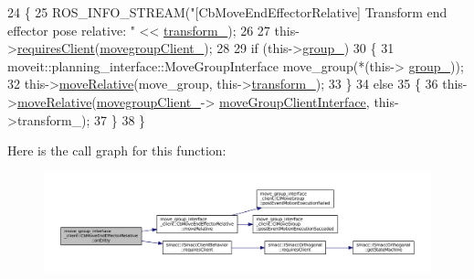 \begin{DoxyCode}
24     \{
25         ROS\_INFO\_STREAM(\textcolor{stringliteral}{"[CbMoveEndEffectorRelative] Transform end effector pose relative: "} << 
      \hyperlink{classmove__group__interface__client_1_1CbMoveEndEffectorRelative_a180b4e40316bc8d8d578c98b2fac068f}{transform\_});
26 
27         this->\hyperlink{classsmacc_1_1ISmaccClientBehavior_a32b16e99e3b4cb289414203dc861a440}{requiresClient}(\hyperlink{classmove__group__interface__client_1_1CbMoveEndEffectorRelative_a979ec9c309b1b52a0d0e254b49865fdc}{movegroupClient\_});
28 
29         \textcolor{keywordflow}{if} (this->\hyperlink{classmove__group__interface__client_1_1CbMoveEndEffectorRelative_a3165754a85fd7046e470a399f24d9fb6}{group\_})
30         \{
31             moveit::planning\_interface::MoveGroupInterface move\_group(*(this->
      \hyperlink{classmove__group__interface__client_1_1CbMoveEndEffectorRelative_a3165754a85fd7046e470a399f24d9fb6}{group\_}));
32             this->\hyperlink{classmove__group__interface__client_1_1CbMoveEndEffectorRelative_a8f64d14c4a398b455b1953ae61cc58bc}{moveRelative}(move\_group, this->\hyperlink{classmove__group__interface__client_1_1CbMoveEndEffectorRelative_a180b4e40316bc8d8d578c98b2fac068f}{transform\_});
33         \}
34         \textcolor{keywordflow}{else}
35         \{
36             this->\hyperlink{classmove__group__interface__client_1_1CbMoveEndEffectorRelative_a8f64d14c4a398b455b1953ae61cc58bc}{moveRelative}(\hyperlink{classmove__group__interface__client_1_1CbMoveEndEffectorRelative_a979ec9c309b1b52a0d0e254b49865fdc}{movegroupClient\_}->
      \hyperlink{classmove__group__interface__client_1_1ClMoveGroup_a5f0ea9b52695661b17605691168d1f31}{moveGroupClientInterface}, this->transform\_);
37         \}
38     \}
\end{DoxyCode}
Here is the call graph for this function\+:
\nopagebreak
\begin{figure}[H]
\begin{center}
\leavevmode
\includegraphics[width=350pt]{classmove__group__interface__client_1_1CbMoveEndEffectorRelative_a54ba18388e200b43fda82a5f438d677e_cgraph}
\end{center}
\end{figure}
\mbox{\label{classmove__group__interface__client_1_1CbMoveEndEffectorRelative_a30bceb2ccee1a91e82f2d6a275bd8581}} 
